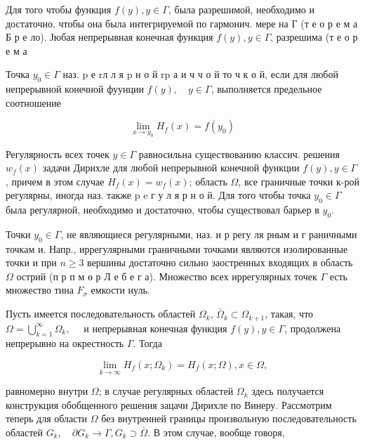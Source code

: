\documentclass[10pt]{article}
\begin{document}
Для того чтобы функция $f(y), y \in \Gamma$, была разрешимой, необходимо и достаточно, чтобы она была интегрируемой по гармонич. мере на Г (т е о р е м а Б р е ло). Јюбая непрерывная конечная функция $f(y), y \in \Gamma$, разрешима (т е о р е м а



Точка $y_{0} \in \Gamma$ наз. $\mathrm{p}$ е $\mathrm{r} \mathbf{л}$ л я $\mathrm{p}$ н о й $\mathrm{r} \mathrm{p}$ а и ч ч о й то ч к о й, если для любой непрерывной конечной фуунции $f(y), \quad y \in \Gamma$, выполняется предельное соотношение



\[

\lim _{x \rightarrow y_{0}} H_{f}(x)=f\left(y_{0}\right)

\]



Регулярность всех точек $y \in \Gamma$ равносильна существованию классич. решения $w_{f}(x)$ задачи Дирихле для любой непрерывной конечной функции $f(y), y \in \Gamma$, причем в этом случае $H_{f}(x)=w_{f}(x)$; область $\Omega$, все граничные точки к-рой регулярны, иногда наз. также p e г у л я р н о й. Для того чтобы точка $y_{0} \in \Gamma$ была регулярной, необходимо и достаточно, чтобы существовал барьер в $y_{0}$.



Точки $y_{0} \in \Gamma$, не являющиеся регулярными, наз. и р регу ля рным и г раничными точкам и. Напр., иррегулярными граничными точками являются изолированные точки и при $n \geqslant 3$ вершины достаточно сильно заостренных входящих в область $\Omega$ острий (п р п м ө р Л е б е г а). Множество всех иррегулярных точек $\Gamma$ есть множество тина $F_{\sigma}$ емкости нуль.



Пусть имеется последовательность областей $\Omega_{k}$, $\bar{\Omega}_{k} \subset \Omega_{k+1}$, такая, что $\Omega=\bigcup_{k=1}^{\infty} \Omega_{k}, \quad$ и непрерывная конечная функция $f(y), y \in \Gamma$, продолжена непрерывно на окрестность $\Gamma$. Тогда



\[

\lim _{k \rightarrow \infty} H_{f}\left(x ; \Omega_{k}\right)=H_{f}(x ; \Omega), x \in \Omega,

\]



равномерно внутри $\Omega$; в случае регулярных областей $\Omega_{k}$ здесь получается конструкция обобщенного решения зацачи Дирихле по Винеру. Рассмотрим теперь для области $\Omega$ без внутренней границы произвольную последовательность областей $G_{k}, \quad \partial G_{k} \rightarrow \Gamma, G_{k} \supset \bar{\Omega}$. В этом случае, вообще говоря,
\end{document}
